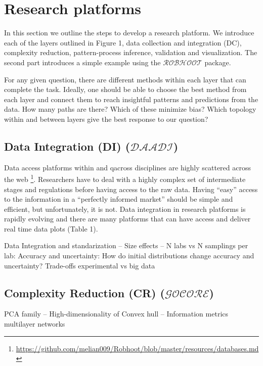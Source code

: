 \documentclass[english,12pt]{article}
\begin{document}



\section{Research platforms}
In this section we outline the steps to develop a research
platform. We introduce each of the layers outlined in Figure 1, data
collection and integration (DC), complexity reduction, pattern-process
inference, validation and visualization. The second part introduces a
simple example using the $\mathcal{ROBHOOT}$ package.


For any given question, there are different
methods within each layer that can complete the task. Ideally, one
should be able to choose the best method from each layer and connect
them to reach insightful patterns and predictions from the data. How
many paths are there? Which of these minimize bias? Which topology
within and between layers give the best response to our question?


\subsection{Data Integration (DI) ($\mathcal{DAADI}$)}

Data access platforms within and qacross disciplines are highly
scattered across the web
\footnote{\url{https://github.com/melian009/Robhoot/blob/master/resources/databases.md}}. Researchers
have to deal with a highly complex set of intermediate stages and
regulations before having access to the raw data. Having ``easy''
access to the information in a ``perfectly informed market'' should be
simple and efficient, but unfortunately, it is not. Data integration
in research platforms is rapidly evolving and there are many platforms
that can have access and deliver real time data plots (Table 1).

Data Integration and standarization -- Size effects -- N labs vs N
samplings per lab: Accuracy and uncertainty: How do initial
distributions change accuracy and uncertainty? Trade-offs experimental
vs big data



\subsection{Complexity Reduction (CR) ($\mathcal{GOCORE}$)}

PCA family -- High-dimensionality of Convex hull -- Information metrics multilayer networks\\
\end{document}
